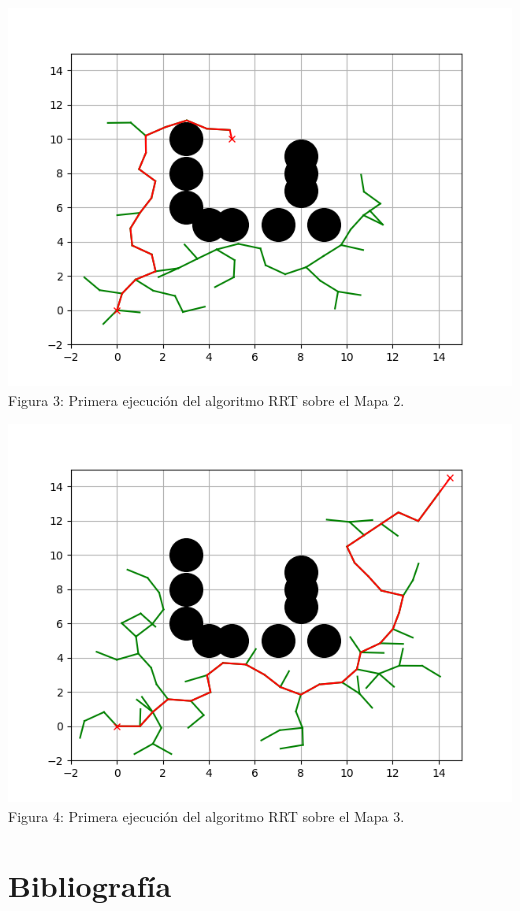 \documentclass[14pt]{extarticle}
\theoremstyle{definition}
\theoremstyle{remark}
\begin{document}
\begin{center}
    \includegraphics[scale=0.7]{Map2_1.png}
    \\Figura 3: Primera ejecución del algoritmo RRT sobre el Mapa 2.
\end{center}

\begin{center}
    \includegraphics[scale=0.7]{Map3_1.png}
    \\Figura 4: Primera ejecución del algoritmo RRT sobre el Mapa 3.
\end{center}

\newpage
\section{Bibliografía}\label{sec:bibliografia}


\end{document}
